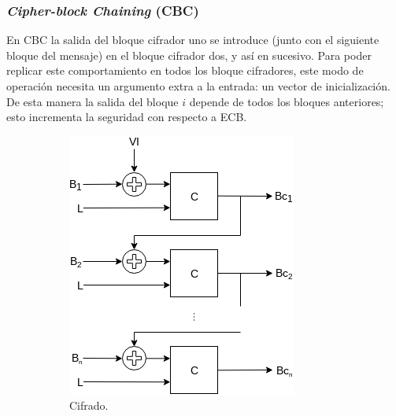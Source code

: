 %
%

\subsubsection{\textit{Cipher-block Chaining} (CBC)}

En CBC la salida del bloque cifrador uno se introduce (junto con el siguiente
bloque del mensaje) en el bloque cifrador dos, y así en sucesivo. Para poder
replicar este comportamiento en todos los bloque cifradores, este modo de
operación necesita un argumento extra a la entrada: un vector de
inicialización. De esta manera la salida del bloque $ i $ depende de todos
los bloques anteriores; esto incrementa la seguridad con respecto a ECB.

\begin{figure}[H]
  \centering
  \begin{subfigure}{0.45\textwidth}
      \begin{center}
          \includegraphics[width=0.7\linewidth]
            {contenidos/antecedentes/bloques/modos/diagramas/modo_cbc.png}
          \caption{Cifrado.}
      \end{center}
  \end{subfigure}
  \begin{subfigure}{0.45\textwidth}
      \begin{center}

\end{center}
\end{subfigure}
\end{figure}
